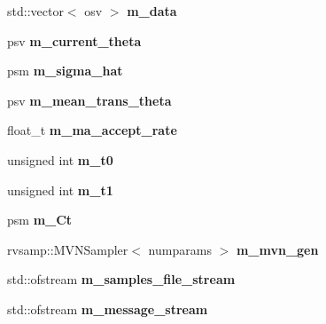 \begin{DoxyCompactItemize}
\item 
\mbox{\label{classada__pmmh_a223edc72cf3bd29a5af875868b8c3aa4}} 
std\+::vector$<$ osv $>$ {\bfseries m\+\_\+data}
\item 
\mbox{\label{classada__pmmh_af15cd995ee4fe6899a0d7620da9e85ac}} 
psv {\bfseries m\+\_\+current\+\_\+theta}
\item 
\mbox{\label{classada__pmmh_a7bbb6e557f17463c4c737b8ed05640d1}} 
psm {\bfseries m\+\_\+sigma\+\_\+hat}
\item 
\mbox{\label{classada__pmmh_a43e025b59c1815b229bdb4af5fd57563}} 
psv {\bfseries m\+\_\+mean\+\_\+trans\+\_\+theta}
\item 
\mbox{\label{classada__pmmh_aad3f20d6927cffc2463f1fd5f0d64564}} 
float\+\_\+t {\bfseries m\+\_\+ma\+\_\+accept\+\_\+rate}
\item 
\mbox{\label{classada__pmmh_a17cfbfac90567dac196d1dc67a4c2fb6}} 
unsigned int {\bfseries m\+\_\+t0}
\item 
\mbox{\label{classada__pmmh_a0e652a72e2053f8ff614532561b44e4d}} 
unsigned int {\bfseries m\+\_\+t1}
\item 
\mbox{\label{classada__pmmh_a1dfe91b3461db5babeb4e907d13e285a}} 
psm {\bfseries m\+\_\+\+Ct}
\item 
\mbox{\label{classada__pmmh_aac16c9d672a2fc042e16ff1902e7bcba}} 
rvsamp\+::\+M\+V\+N\+Sampler$<$ numparams $>$ {\bfseries m\+\_\+mvn\+\_\+gen}
\item 
\mbox{\label{classada__pmmh_a1aeb930c4779048021499b7c8607ca6e}} 
std\+::ofstream {\bfseries m\+\_\+samples\+\_\+file\+\_\+stream}
\item 
\mbox{\label{classada__pmmh_ac54d9c263a41c8e60c6de68fe1198e98}} 
std\+::ofstream {\bfseries m\+\_\+message\+\_\+stream}
\item 
\mbox{\label{classada__pmmh_a3989efa423b4cad70295e65d5cd14f98}} 

\end{DoxyCompactItemize}
